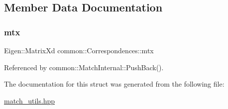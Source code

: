 \subsection{Member Data Documentation}
\mbox{\label{structcommon_1_1Correspondences_ab8841b71f2e02544b010ae5e2bc5308c}} 
\subsubsection{\texorpdfstring{mtx}{mtx}}
{\footnotesize\ttfamily Eigen\+::\+Matrix\+Xd common\+::\+Correspondences\+::mtx}



Referenced by common\+::\+Match\+Internal\+::\+Push\+Back().



The documentation for this struct was generated from the following file\+:\begin{DoxyCompactItemize}
\item 
\hyperlink{match__utils_8hpp}{match\+\_\+utils.\+hpp}\end{DoxyCompactItemize}
